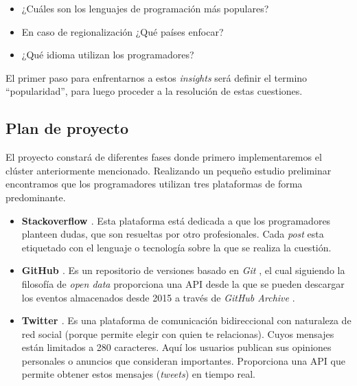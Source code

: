 \begin{itemize}
	\item ¿Cuáles son los lenguajes de programación más populares?
	\item En caso de regionalización ¿Qué países enfocar?
	\item ¿Qué idioma utilizan los programadores?
\end{itemize}

El primer paso para enfrentarnos a estos \textit{insights} será definir el termino ``popularidad'', para luego proceder a la resolución de estas cuestiones.


\subsection{Plan de proyecto}
El proyecto constará de diferentes fases donde primero implementaremos el clúster anteriormente mencionado.
Realizando un pequeño estudio preliminar encontramos que los programadores utilizan tres plataformas de forma predominante.
\begin{itemize}
 	\item \textbf{Stackoverflow \cite{stackoverflow}}. Esta plataforma está dedicada a que los programadores planteen dudas, que son resueltas por otro profesionales. Cada \textit{post} esta etiquetado con el lenguaje o tecnología sobre la que se realiza la cuestión.
 	
 	\item \textbf{GitHub \cite{github}}. Es un repositorio de versiones basado en \textit{Git} \cite{git}, el cual siguiendo la filosofía de \textit{open data} \cite{opendata} proporciona una \gls{API} desde la que se pueden descargar los eventos almacenados desde 2015 a través de \textit{GitHub Archive} \cite{githubArchive}.
 	
 	\item \textbf{Twitter \cite{twitter}}. Es una plataforma de comunicación bidireccional con naturaleza de red social (porque permite elegir con quien te relacionas). Cuyos mensajes están limitados a 280 caracteres. Aquí los usuarios publican sus opiniones personales o anuncios que consideran importantes. Proporciona una \gls{API} que permite obtener estos mensajes (\textit{tweets}) en tiempo real.
\end{itemize}


